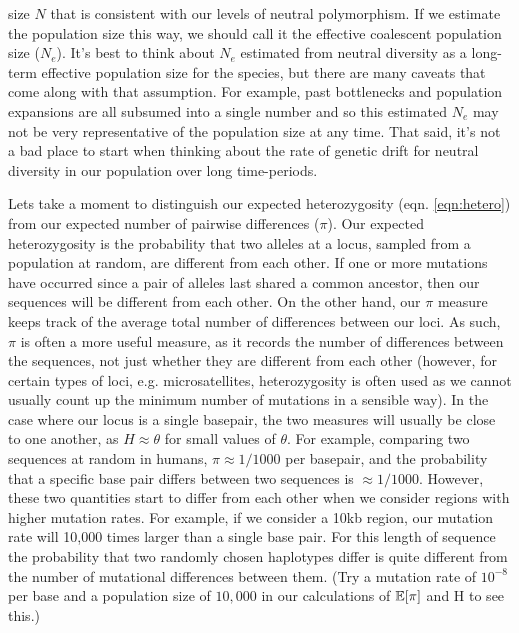 size $N$ that is consistent with our levels of neutral polymorphism. If we estimate the population size this way, we should call it the effective coalescent population size ($N_e$). It's best to think about $N_{e}$ estimated from neutral diversity as a long-term effective population size for the species, but there are many caveats that come along with that assumption. For example, past bottlenecks and population expansions are all subsumed into a single number and so this estimated $N_{e}$ may not be very representative of the population size at any time. That said, it's not a bad place to start when thinking about the rate of genetic drift for neutral diversity in our population over long time-periods. 

Lets take a moment to distinguish our expected heterozygosity (eqn. \ref{eqn:hetero}) from our expected number of pairwise differences ($\pi$). Our expected heterozygosity is the probability that two alleles at a locus, sampled from a population at random, are different from each other. If one or more mutations have occurred since a pair of alleles last shared a common ancestor, then our sequences will be different from each other. On the other hand, our $\pi$ measure keeps track of the average total number of differences between our loci. As such, $\pi$ is often a more useful measure, as it records the number of differences between the sequences, not just whether they are different from each other (however, for certain types of loci, e.g. microsatellites, heterozygosity is often used as we cannot usually count up the minimum number of mutations in a sensible way). In the case where our locus is a single basepair, the two measures will usually be close to one another, as $H \approx \theta$ for small values of $\theta$. For example, comparing two sequences at random in humans, $\pi \approx 1/1000$ per basepair, and the probability that a specific base pair differs between two sequences is $\approx 1/1000$. However, these two quantities start to differ from each other when we consider regions with higher mutation rates. For example, if we consider a 10kb region, our mutation rate will 10,000 times larger than a single base pair. For this length of sequence the probability that two randomly chosen haplotypes differ is quite different from the number of mutational differences  between them. (Try a mutation rate of $10^{-8}$ per base and a population size of $10,000$ in our calculations of $\mathbb{E}[\pi]$ and H to see this.)

